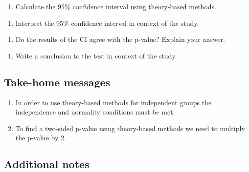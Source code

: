 \documentclass[
]{report}
\providecommand{\tightlist}{%
  \setlength{\itemsep}{0pt}\setlength{\parskip}{0pt}}
\begin{document}
\newpage

\begin{enumerate}
\def\labelenumi{\arabic{enumi}.}
\setcounter{enumi}{13}
\tightlist
\item
  Calculate the 95\% confidence interval using theory-based methods.
\end{enumerate}

\vspace{1in}

\begin{enumerate}
\def\labelenumi{\arabic{enumi}.}
\setcounter{enumi}{14}
\tightlist
\item
  Interpret the 95\% confidence interval in context of the study.
\end{enumerate}

\vspace{1in}

\begin{enumerate}
\def\labelenumi{\arabic{enumi}.}
\setcounter{enumi}{15}
\tightlist
\item
  Do the results of the CI agree with the p-value? Explain your answer.
\end{enumerate}

\vspace{0.5in}

\begin{enumerate}
\def\labelenumi{\arabic{enumi}.}
\setcounter{enumi}{16}
\tightlist
\item
  Write a conclusion to the test in context of the study.
  \vspace{0.8in}
\end{enumerate}

\hypertarget{take-home-messages-21}{%
\subsection{Take-home messages}\label{take-home-messages-21}}

\begin{enumerate}
\def\labelenumi{\arabic{enumi}.}
\item
  In order to use theory-based methods for independent groups the independence and normality conditions must be met.
\item
  To find a two-sided p-value using theory-based methods we need to multiply the p-value by 2.
\end{enumerate}

\hypertarget{additional-notes-21}{%
\subsection{Additional notes}\label{additional-notes-21}}
\end{document}
